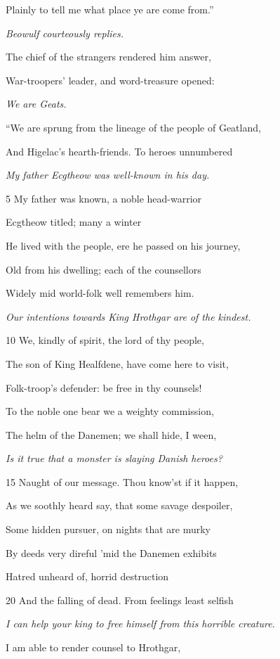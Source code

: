 Plainly to tell me what place ye are come from.”



\emph{Beowulf courteously
replies.}

The chief of the strangers rendered him answer,

War-troopers’ leader, and word-treasure opened:

\emph{We are Geats.}

“We are sprung from the lineage of the people of Geatland,

And Higelac’s hearth-friends. To heroes unnumbered

\emph{My father Ecgtheow
was well-known
in his day.}

5
My father was known, a noble head-warrior

Ecgtheow titled; many a winter

He lived with the people, ere he passed on his journey,

Old from his dwelling; each of the counsellors

Widely mid world-folk well remembers him.

\emph{Our intentions
towards King
Hrothgar are of the
kindest.}

10
We, kindly of spirit, the lord of thy people,

The son of King Healfdene, have come here to visit,

Folk-troop’s defender: be free in thy counsels!

To the noble one bear we a weighty commission,

The helm of the Danemen; we shall hide, I ween,

\emph{Is it true that a
monster is slaying
Danish heroes?}

15
Naught of our message. Thou know’st if it happen,

As we soothly heard say, that some savage despoiler,

Some hidden pursuer, on nights that are murky

By deeds very direful ’mid the Danemen exhibits

Hatred unheard of, horrid destruction

20
And the falling of dead. From feelings least selfish

\emph{I can help your
king to free himself
from this horrible
creature.}

I am able to render counsel to Hrothgar,

